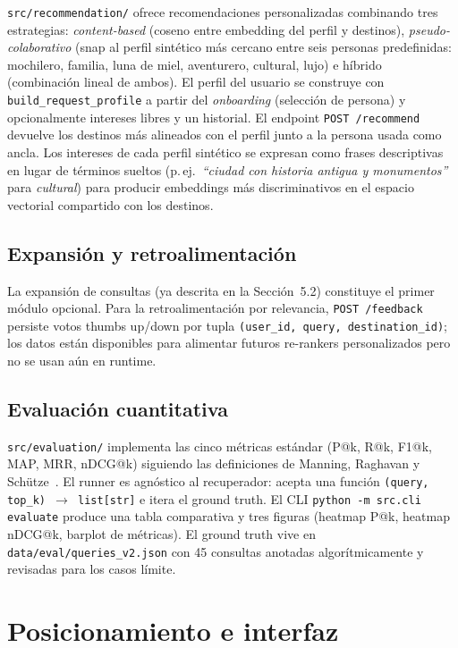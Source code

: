 \documentclass[runningheads,a4paper]{llncs}
\begin{document}
\texttt{src/recommendation/} ofrece recomendaciones personalizadas combinando tres estrategias: \emph{content-based} (coseno entre embedding del perfil y destinos), \emph{pseudo-colaborativo} (snap al perfil sint\'etico m\'as cercano entre seis personas predefinidas: mochilero, familia, luna de miel, aventurero, cultural, lujo) e h\'ibrido (combinaci\'on lineal de ambos). El perfil del usuario se construye con \texttt{build\_request\_profile} a partir del \emph{onboarding} (selecci\'on de persona) y opcionalmente intereses libres y un historial. El endpoint \texttt{POST /recommend} devuelve los destinos m\'as alineados con el perfil junto a la persona usada como ancla. Los intereses de cada perfil sint\'etico se expresan como frases descriptivas en lugar de t\'erminos sueltos (p.\,ej.\ \emph{``ciudad con historia antigua y monumentos''} para \emph{cultural}) para producir embeddings m\'as discriminativos en el espacio vectorial compartido con los destinos.

\subsection{Expansi\'on y retroalimentaci\'on}

La expansi\'on de consultas (ya descrita en la Secci\'on~5.2) constituye el primer m\'odulo opcional. Para la retroalimentaci\'on por relevancia, \texttt{POST /feedback} persiste votos thumbs up/down por tupla \texttt{(user\_id, query, destination\_id)}; los datos est\'an disponibles para alimentar futuros re-rankers personalizados pero no se usan a\'un en runtime.

\subsection{Evaluaci\'on cuantitativa}

\texttt{src/evaluation/} implementa las cinco m\'etricas est\'andar (P@k, R@k, F1@k, MAP, MRR, nDCG@k) siguiendo las definiciones de Manning, Raghavan y Sch\"utze~\cite{manning2008ir}. El runner es agn\'ostico al recuperador: acepta una funci\'on \texttt{(query, top\_k) $\to$ list[str]} e itera el ground truth. El CLI \texttt{python -m src.cli evaluate} produce una tabla comparativa y tres figuras (heatmap P@k, heatmap nDCG@k, barplot de m\'etricas). El ground truth vive en \texttt{data/eval/queries\_v2.json} con 45 consultas anotadas algor\'itmicamente y revisadas para los casos l\'imite.

\section{Posicionamiento e interfaz}
\label{sec:posicionamiento}
\end{document}

